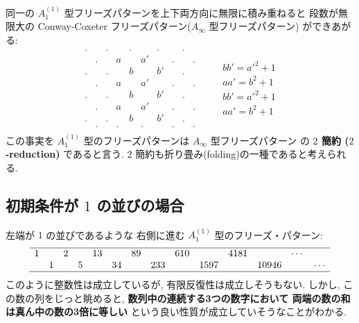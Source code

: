 \documentclass[12pt,twoside,dvipdfm]{jarticle}
\newcommand\red{\color{red}}
\theoremstyle{definition} %
\theoremstyle{definition} %
\theoremstyle{definition} %
\numberwithin{theorem}{section}
\numberwithin{equation}{section}
\numberwithin{figure}{section}
\numberwithin{table}{section}
\begin{document}
同一の $A^{(1)}_1$ 型フリーズパターンを上下両方向に無限に積み重ねると
段数が無限大の Conway-Coxeter フリーズパターン($A_\infty$ 型フリーズパターン)
ができあがる:
\begin{equation*}
\begin{array}{cccccccccc}
 . &   & . &   & . &   & . &   & . &   \\
   & . &   & a &   & a'&   & . &   & . \\
 . &   & . &   & b &   & b'&   & . &   \\
   & . &   & a &   & a'&   & . &   & . \\
 . &   & . &   & b &   & b'&   & . &   \\
   & . &   & a &   & a'&   & . &   & . \\
 . &   & . &   & b &   & b'&   & . &   \\
   & . &   & . &   & . &   & . &   & . \\
\end{array}
\qquad
\begin{array}{l}
\\
\\
bb' = a'^2 +1 \\
aa' = b^2  +1 \\
bb' = a'^2 +1 \\
aa' = b^2  +1 \\
\\
\\
\end{array}
\end{equation*}
この事実を $A^{(1)}_1$ 型のフリーズパターンは $A_\infty$ 型フリーズパターン
の {\bf\red $2$ 簡約 ($2$-reduction)} であると言う.
$2$ 簡約も折り畳み(folding)の一種であると考えられる.


\subsection{初期条件が $1$ の並びの場合}

左端が $1$ の並びであるような
右側に進む $A^{(1)}_1$ 型のフリーズ・パターン:
\begin{equation*}
\begin{array}{cccccccccccccccccc}\hline
1 &   & 2 &   &13 &   & 89&   &610&    &4181&     &\cdots&      \\
  & 1 &   & 5 &   & 34&   &233&   &1597&    &10946&      &\cdots\\ \hline
\end{array}
\end{equation*}
このように整数性は成立しているが, 
有限反復性は成立しそうもない.
しかし, この数の列をじっと眺めると, 
{\bf 数列中の連続する3つの数字において
両端の数の和は真ん中の数の3倍に等しい}
という良い性質が成立していそうなことがわかる.
\end{document}
